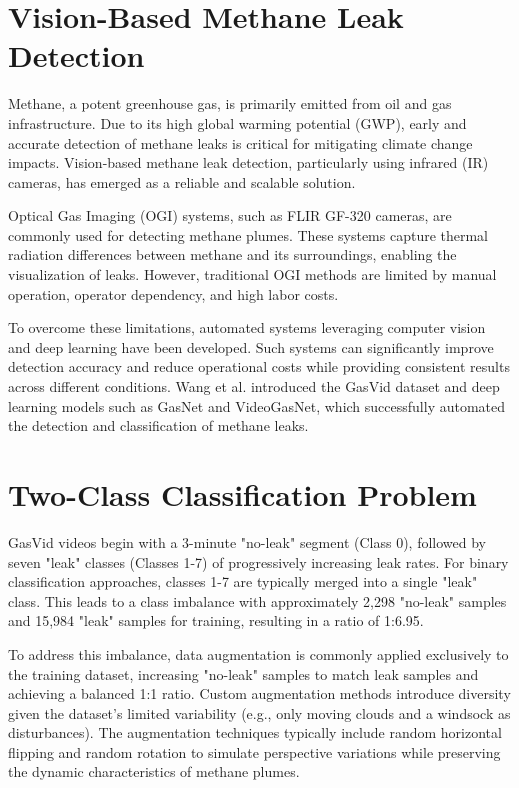 \section{Vision-Based Methane Leak Detection}

Methane, a potent greenhouse gas, is primarily emitted from oil and gas infrastructure. Due to its high global warming potential (GWP), early and accurate detection of methane leaks is critical for mitigating climate change impacts. Vision-based methane leak detection, particularly using infrared (IR) cameras, has emerged as a reliable and scalable solution.

Optical Gas Imaging (OGI) systems, such as FLIR GF-320 cameras, are commonly used for detecting methane plumes. These systems capture thermal radiation differences between methane and its surroundings, enabling the visualization of leaks. However, traditional OGI methods are limited by manual operation, operator dependency, and high labor costs.

To overcome these limitations, automated systems leveraging computer vision and deep learning have been developed. Such systems can significantly improve detection accuracy and reduce operational costs while providing consistent results across different conditions. Wang et al. introduced the GasVid dataset and deep learning models such as GasNet and VideoGasNet, which successfully automated the detection and classification of methane leaks.

\section{Two-Class Classification Problem}

GasVid videos begin with a 3-minute "no-leak" segment (Class 0), followed by seven "leak" classes (Classes 1-7) of progressively increasing leak rates. For binary classification approaches, classes 1-7 are typically merged into a single "leak" class. This leads to a class imbalance with approximately 2,298 "no-leak" samples and 15,984 "leak" samples for training, resulting in a ratio of 1:6.95.

To address this imbalance, data augmentation is commonly applied exclusively to the training dataset, increasing "no-leak" samples to match leak samples and achieving a balanced 1:1 ratio. Custom augmentation methods introduce diversity given the dataset's limited variability (e.g., only moving clouds and a windsock as disturbances). The augmentation techniques typically include random horizontal flipping and random rotation to simulate perspective variations while preserving the dynamic characteristics of methane plumes.


